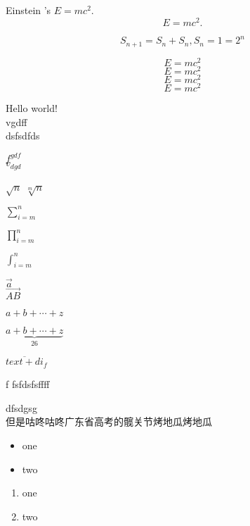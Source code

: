 Einstein 's $E=mc^2$.   %
\[ E=mc^2. \]   %

\begin{displaymath} 
S_{n+1} = S_{n} + S_{n},  
S_{n}=1=2^{n} 
\end{displaymath}


\begin{equation} 
E=mc^2 
\end{equation}
\begin{equation} 
E=mc^2 
\end{equation}
\begin{equation} 
E=mc^2 
\end{equation}
\begin{equation} 
E=mc^2 
\end{equation}


Hello world! \\
vgdff \\
dsfsdfds

$f^{gdf}$ \\
$v_{dgd}$

$\sqrt{n}$
$\sqrt[m]{n}$

$\sum_{i=m}^{n}$

$\prod_{i=m}^{n}$


$\int_{i=m}^n$


$\vec {a}$\\
$\overrightarrow{AB}$

$a+b+\cdots+z$

$\underbrace{a+b+\cdots+z}_{26}$

$\overline{text+di}_{f}$

{f}
fsfdsfsffff

dfsdgsg\\

但是咕咚咕咚广东省高考的髋关节烤地瓜烤地瓜\\

\begin{itemize}
	\item one
	\item two
\end{itemize}

\begin{enumerate}
	\item one
	\item two
\end{enumerate}
	































